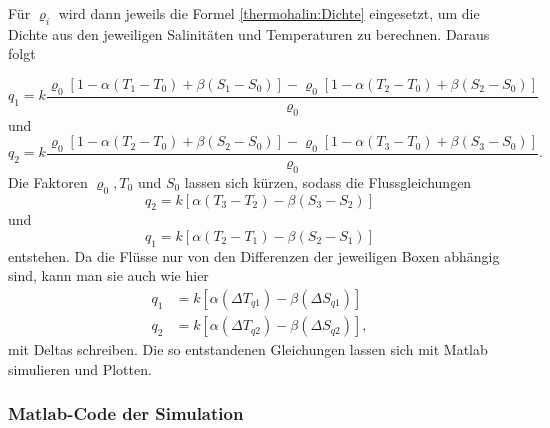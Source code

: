Für $\varrho_i$ wird dann jeweils die Formel \ref{thermohalin:Dichte} eingesetzt, um die Dichte aus den jeweiligen Salinitäten und Temperaturen zu berechnen. Daraus folgt

\begin{equation}
q_1 = k\frac{\varrho_0[1-\alpha(T_1-T_0)+\beta(S_1-S_0)]-\varrho_0[1-\alpha(T_2-T_0)+\beta(S_2-S_0)]}{\varrho_0}
\end{equation}
und 
\begin{equation}
q_2 = k\frac{\varrho_0[1-\alpha(T_2-T_0)+\beta(S_2-S_0)]-\varrho_0[1-\alpha(T_3-T_0)+\beta(S_3-S_0)]}{\varrho_0}.
\end{equation}
Die Faktoren $\varrho_0, T_0$ und $S_0$ lassen sich kürzen, sodass die Flussgleichungen 
\begin{equation}
 q_2 = k[\alpha(T_3-T_2)-\beta(S_3-S_2)]
\end{equation}
und 
\begin{equation}
 q_1 = k[\alpha(T_2-T_1)-\beta(S_2-S_1)] 
\end{equation}
entstehen.
Da die Flüsse nur von den Differenzen der jeweiligen Boxen abhängig sind, kann man sie auch wie hier
\begin{equation}
\begin{aligned}
q_1 &= k[\alpha(\Delta T_{q1})-\beta(\Delta S_{q1})] 
\\
q_2 &= k[\alpha(\Delta T_{q2})-\beta(\Delta S_{q2})],
\end{aligned}
\end{equation}
mit Deltas schreiben.
Die so entstandenen Gleichungen lassen sich mit Matlab simulieren und Plotten.


\subsubsection{Matlab-Code der Simulation}

